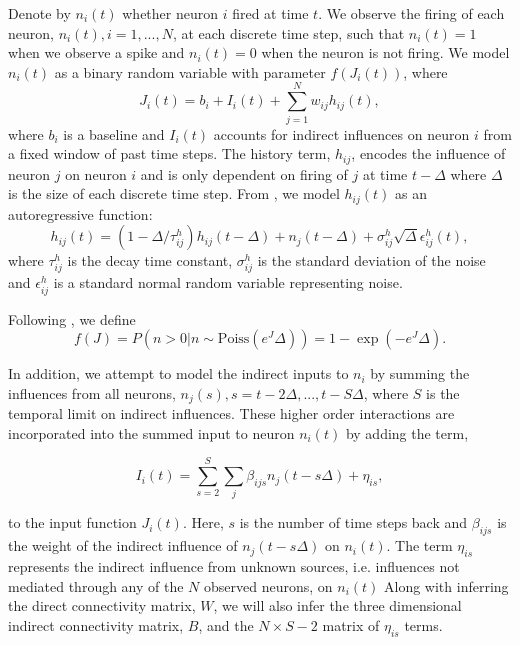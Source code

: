 \documentclass{article}
\begin{document}
Denote by $ n_i(t) $ whether neuron $i$ fired at time $t$. We observe
the firing of each neuron, $n_i(t), i = 1,...,N$, at each discrete time step, such that $n_i(t) = 1$ when we observe a spike and $n_i(t) = 0$ when the neuron is not firing. We model $n_i(t)$ as a
binary random variable with parameter $f(J_i(t))$, where
\begin{equation}\label{J}  J_i(t) = b_i + I_i(t) + \sum_{j=1}^{N}
w_{ij}h_{ij}(t), \end{equation} where $b_i$ is a baseline and $I_i(t)$
accounts for indirect influences on neuron $i$ from a fixed window of
past time steps. The history term, $h_{ij}$, encodes
the influence of neuron $j$ on neuron $i$ and is only dependent on firing of $j$ at time $t-\Delta$ where $\Delta$ is the size of each discrete time step.
From \citep{mishchencko2011}, we model $h_{ij}(t)$ as an autoregressive function: \begin{equation}\label{h} h_{ij}(t) = (1-\Delta/\tau_{ij}^h)h_{ij}(t-\Delta)
  + n_j(t-\Delta)+\sigma_{ij}^h\sqrt{\Delta}\epsilon_{ij}^h(t), \end{equation}
where $ \tau_{ij}^h $ is the decay time constant, $\sigma_{ij}^h$ is the
standard deviation of the noise and $\epsilon_{ij}^h$ is a standard
normal random variable representing noise.

Following \citep{mishchencko2011}, we define \begin{equation}
\label{f} f(J) = P\left(n>0 | n \sim \text{Poiss}(e^J\Delta)\right) = 1 - \exp(-e^J\Delta). \end{equation}

In addition, we attempt to model the indirect inputs to $n_i$ by summing the influences from all neurons, $n_j(s), s=t-2\Delta,...,t-S\Delta$, where $S$ is the temporal limit on indirect influences. These higher order interactions are incorporated into the summed input to neuron $n_i(t)$ by adding the term,

\begin{equation}
\label{new_term}
I_i(t)=\displaystyle\sum\limits_{s=2}^S\sum\limits_{j} \beta_{ijs}n_j(t-s\Delta) + \eta_{is},
\end{equation}


to the input function $J_i(t)$. Here, $s$ is the number of time steps back and $\beta_{ijs}$ is the weight of the indirect influence of $n_j(t-s\Delta)$ on $n_i(t)$. The term $\eta_{is}$ represents the indirect influence from unknown sources, i.e. influences not mediated through any of the $N$ observed neurons, on $n_i(t)$  Along with inferring the direct connectivity matrix, $W$, we will also infer the three dimensional indirect connectivity matrix, $B$, and the $N\times S-2$ matrix of $\eta_{is}$ terms.
\end{document}
